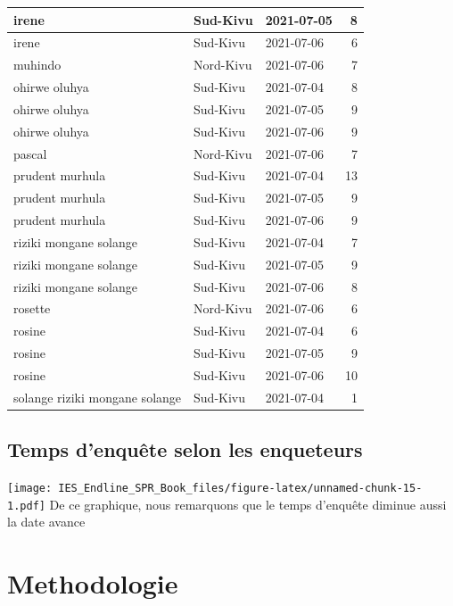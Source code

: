 \documentclass[
]{book}
\begin{document}
\begin{table}
\begin{tabular}[t]{l|l|l|r}
\hline
irene & Sud-Kivu & 2021-07-05 & 8\\
\hline
irene & Sud-Kivu & 2021-07-06 & 6\\
\hline
muhindo & Nord-Kivu & 2021-07-06 & 7\\
\hline
ohirwe oluhya & Sud-Kivu & 2021-07-04 & 8\\
\hline
ohirwe oluhya & Sud-Kivu & 2021-07-05 & 9\\
\hline
ohirwe oluhya & Sud-Kivu & 2021-07-06 & 9\\
\hline
pascal & Nord-Kivu & 2021-07-06 & 7\\
\hline
prudent murhula & Sud-Kivu & 2021-07-04 & 13\\
\hline
prudent murhula & Sud-Kivu & 2021-07-05 & 9\\
\hline
prudent murhula & Sud-Kivu & 2021-07-06 & 9\\
\hline
riziki mongane solange & Sud-Kivu & 2021-07-04 & 7\\
\hline
riziki mongane solange & Sud-Kivu & 2021-07-05 & 9\\
\hline
riziki mongane solange & Sud-Kivu & 2021-07-06 & 8\\
\hline
rosette & Nord-Kivu & 2021-07-06 & 6\\
\hline
rosine & Sud-Kivu & 2021-07-04 & 6\\
\hline
rosine & Sud-Kivu & 2021-07-05 & 9\\
\hline
rosine & Sud-Kivu & 2021-07-06 & 10\\
\hline
solange riziki mongane solange & Sud-Kivu & 2021-07-04 & 1\\
\hline
\end{tabular}
\end{table}

\hypertarget{temps-denquuxeate-selon-les-enqueteurs}{%
\section{Temps d'enquête selon les enqueteurs}\label{temps-denquuxeate-selon-les-enqueteurs}}

\texttt{[image: IES\_Endline\_SPR\_Book\_files/figure-latex/unnamed-chunk-15-1.pdf]}
De ce graphique, nous remarquons que le temps d'enquête diminue aussi la date avance

\hypertarget{methodologie}{%
\chapter{Methodologie}\label{methodologie}}
\end{document}
